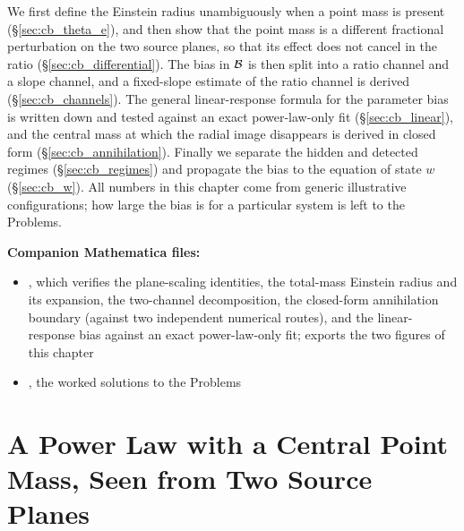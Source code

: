 We first define the Einstein radius unambiguously when a point mass is
present (\S\ref{sec:cb_theta_e}), and then show that the point mass is
a different fractional perturbation on the two source planes, so that
its effect does not cancel in the ratio (\S\ref{sec:cb_differential}).
The bias in $\mathcal{B}$ is then split into a ratio channel and a slope
channel, and a fixed-slope estimate of the ratio channel is derived
(\S\ref{sec:cb_channels}). The general linear-response formula for the
parameter bias is written down and tested against an exact
power-law-only fit (\S\ref{sec:cb_linear}), and the central mass at
which the radial image disappears is derived in closed form
(\S\ref{sec:cb_annihilation}). Finally we separate the hidden and
detected regimes (\S\ref{sec:cb_regimes}) and propagate the bias to the
equation of state $w$ (\S\ref{sec:cb_w}). All numbers in this chapter
come from generic illustrative configurations; how large the bias is
for a particular system is left to the Problems.

\medskip
\noindent
\textbf{Companion Mathematica files:}
\begin{itemize}[nosep]
    \item {},
          which verifies the plane-scaling identities, the total-mass
          Einstein radius and its expansion, the two-channel
          decomposition, the closed-form annihilation boundary (against
          two independent numerical routes), and the linear-response bias
          against an exact power-law-only fit; exports the two figures of
          this chapter
    \item {},
          the worked solutions to the Problems
\end{itemize}


\section{A Power Law with a Central Point Mass, Seen from Two Source Planes}
\label{sec:cb_setup}

